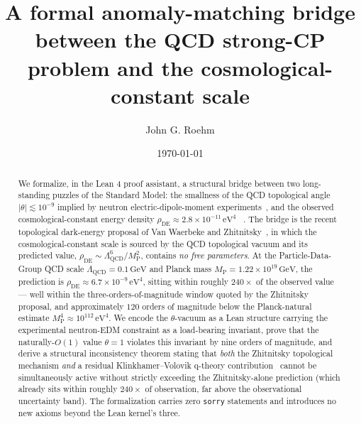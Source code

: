 \documentclass[twocolumn]{revtex4-2}
\newcommand{\rhoDE}{\rho_{\mathrm{DE}}}
\newcommand{\Lqcd}{\Lambda_{\mathrm{QCD}}}
\newcommand{\MP}{M_{\mathrm{P}}}
\begin{document}
\title{A formal anomaly-matching bridge between the QCD strong-CP problem
and the cosmological-constant scale}

\author{John G. Roehm}

\date{\today}

\begin{abstract}
We formalize, in the Lean 4 proof assistant, a structural bridge between
two long-standing puzzles of the Standard Model: the smallness of the
QCD topological angle $|\theta| \lesssim 10^{-9}$ implied by neutron
electric-dipole-moment experiments~\cite{Pendlebury2015}, and the
observed cosmological-constant energy density
$\rhoDE \approx 2.8\times 10^{-11}\,\mathrm{eV}^4$
~\cite{Planck2018,DESI2024}. The bridge is the recent topological
dark-energy proposal of Van Waerbeke and
Zhitnitsky~\cite{VanWaerbeke2025}, in which the cosmological-constant
scale is sourced by the QCD topological vacuum and its predicted value,
$\rhoDE \sim \Lqcd^6 / \MP^2$, contains \emph{no free parameters}. At
the Particle-Data-Group QCD scale $\Lqcd = 0.1\,\mathrm{GeV}$ and
Planck mass $\MP = 1.22 \times 10^{19}\,\mathrm{GeV}$, the prediction
is $\rhoDE \approx 6.7 \times 10^{-9}\,\mathrm{eV}^4$, sitting within
roughly $240\times$ of the observed value --- well within the
three-orders-of-magnitude window quoted by the Zhitnitsky proposal,
and approximately $120$ orders of magnitude below the Planck-natural
estimate $\MP^4 \approx 10^{112}\,\mathrm{eV}^4$. We encode the
$\theta$-vacuum as a Lean structure carrying the experimental neutron-EDM
constraint as a load-bearing invariant, prove that the
naturally-$O(1)$ value $\theta = 1$ violates this invariant by nine orders
of magnitude, and derive a structural inconsistency theorem stating that
\emph{both} the Zhitnitsky topological mechanism \emph{and} a residual
Klinkhamer--Volovik q-theory contribution~\cite{KlinkhamerVolovik2010}
cannot be simultaneously active without strictly exceeding the
Zhitnitsky-alone prediction (which already sits within roughly $240\times$
of observation, far above the observational uncertainty band). The
formalization carries zero
\texttt{sorry} statements and introduces no new axioms beyond the Lean
kernel's three.
\end{abstract}

\maketitle
\end{document}

